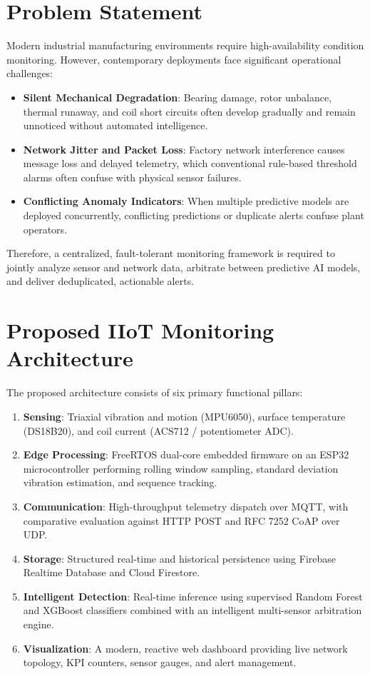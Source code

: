 \documentclass[12pt,a4paper]{report}
\begin{document}
\section{Problem Statement}
Modern industrial manufacturing environments require high-availability condition monitoring. However, contemporary deployments face significant operational challenges:
\begin{itemize}
    \item \textbf{Silent Mechanical Degradation}: Bearing damage, rotor unbalance, thermal runaway, and coil short circuits often develop gradually and remain unnoticed without automated intelligence.
    \item \textbf{Network Jitter and Packet Loss}: Factory network interference causes message loss and delayed telemetry, which conventional rule-based threshold alarms often confuse with physical sensor failures.
    \item \textbf{Conflicting Anomaly Indicators}: When multiple predictive models are deployed concurrently, conflicting predictions or duplicate alerts confuse plant operators.
\end{itemize}
Therefore, a centralized, fault-tolerant monitoring framework is required to jointly analyze sensor and network data, arbitrate between predictive AI models, and deliver deduplicated, actionable alerts.

\section{Proposed IIoT Monitoring Architecture}
The proposed architecture consists of six primary functional pillars:
\begin{enumerate}
    \item \textbf{Sensing}: Triaxial vibration and motion (MPU6050), surface temperature (DS18B20), and coil current (ACS712 / potentiometer ADC).
    \item \textbf{Edge Processing}: FreeRTOS dual-core embedded firmware on an ESP32 microcontroller performing rolling window sampling, standard deviation vibration estimation, and sequence tracking.
    \item \textbf{Communication}: High-throughput telemetry dispatch over MQTT, with comparative evaluation against HTTP POST and RFC 7252 CoAP over UDP.
    \item \textbf{Storage}: Structured real-time and historical persistence using Firebase Realtime Database and Cloud Firestore.
    \item \textbf{Intelligent Detection}: Real-time inference using supervised Random Forest and XGBoost classifiers combined with an intelligent multi-sensor arbitration engine.
    \item \textbf{Visualization}: A modern, reactive web dashboard providing live network topology, KPI counters, sensor gauges, and alert management.
\end{enumerate}
\end{document}
